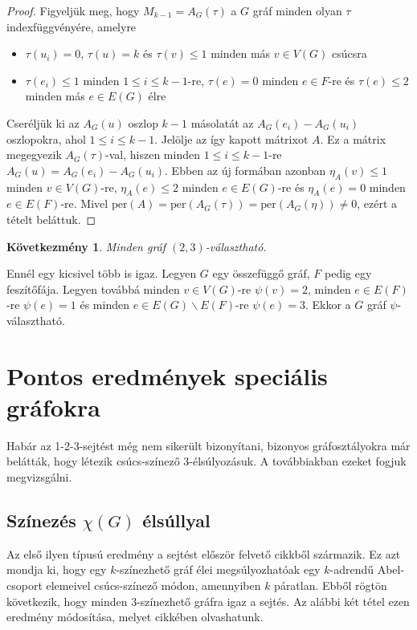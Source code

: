 \documentclass[12pt, a4paper]{report}
\newtheorem*{köv}{Következmény}
\theoremstyle{remark}
\theoremstyle{definition}
\begin{document}
\begin{proof}
Figyeljük meg, hogy $M_{k - 1} = A_G(\tau)$ a $G$ gráf minden olyan $\tau$ indexfüggvényére, amelyre
\begin{itemize}
\item $\tau(u_i) = 0$, $\tau(u) = k$ és $\tau(v) \leq 1$ minden más $v \in V(G)$ csúcsra
\item $\tau(e_i) \leq 1$ minden $1 \leq i \leq k - 1$-re, $\tau(e) = 0$ minden $e \in F$-re és $\tau(e) \leq 2$ minden más $e \in E(G)$ élre
\end{itemize}

Cseréljük ki az $A_G(u)$ oszlop $k - 1$ másolatát az $A_G(e_i) - A_G(u_i)$ oszlopokra, ahol $1 \leq i \leq k - 1$. Jelölje az így kapott mátrixot $A$. Ez a mátrix megegyezik $A_G(\tau)$-val, hiszen minden $1 \leq i \leq k - 1$-re $A_G(u) = A_G(e_i) - A_G(u_i)$. Ebben az új formában azonban $\eta_A(v) \leq 1$ minden $v \in V(G)$-re, $\eta_A(e) \leq 2$ minden $e \in E(G)$-re és $\eta_A(e) = 0$ minden $e \in E(F)$-re. Mivel $\mathrm{per}(A) = \mathrm{per}(A_G(\tau)) = \mathrm{per}(A_G(\eta)) \neq 0$, ezért a tételt beláttuk.
\end{proof}

\begin{köv}
Minden gráf $(2, 3)$-választható.
\end{köv}

Ennél egy kicsivel több is igaz. Legyen $G$ egy összefüggő gráf, $F$ pedig egy feszítőfája. Legyen továbbá minden $v \in V(G)$-re $\psi(v) = 2$, minden $e \in E(F)$-re $\psi(e) = 1$ és minden $e \in E(G) \smallsetminus E(F)$-re $\psi(e) = 3$. Ekkor a $G$ gráf $\psi$-választható. 

\chapter{Pontos eredmények speciális gráfokra}
Habár az 1-2-3-sejtést még nem sikerült bizonyítani, bizonyos gráfosztályokra már belátták, hogy létezik csúcs-színező $3$-élsúlyozásuk. A továbbiakban ezeket fogjuk megvizsgálni.

\section{Színezés $χ(G)$ élsúllyal}
Az első ilyen típusú eredmény a sejtést először felvető cikkből \cite{Karonski2004} származik. Ez azt mondja ki, hogy egy $k$-színezhető gráf élei megsúlyozhatóak egy $k$-adrendű Abel-csoport elemeivel csúcs-színező módon, amennyiben $k$ páratlan. Ebből rögtön következik, hogy minden $3$-színezhető gráfra igaz a sejtés. Az alábbi két tétel ezen eredmény módosítása, melyet \citeauthor{Lu2011} \cite{Lu2011} cikkében olvashatunk.
\end{document}
